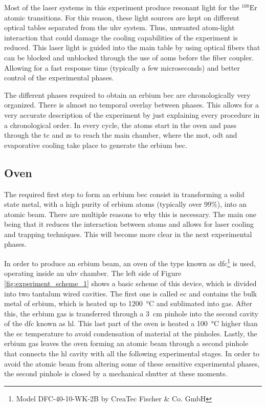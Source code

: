 Most of the laser systems in this experiment produce resonant light for the $^{\text{168}}\text{Er}$ atomic transitions. For this reason, these light sources are kept on different optical tables separated from the \ac{uhv} system. Thus, unwanted atom-light interaction that could damage the cooling capabilities of the experiment is reduced. This laser light is guided into the main table by using optical fibers that can be blocked and unblocked through the use of \acp{aom} before the fiber coupler. Allowing for a fast response time (typically a few microseconds) and better control of the experimental phases.

The different phases required to obtain an erbium \ac{bec} are chronologically very organized. There is almost no temporal overlay between phases. This allows for a very accurate description of the experiment by just explaining every procedure in a chronological order. In every cycle, the atoms start in the oven and pass through the \ac{tc} and \acf{zs} to reach the main chamber, where the \ac{mot}, \ac{odt} and evaporative cooling take place to generate the erbium \acl*{bec}.

\subsection{Oven}

The required first step to form an erbium \ac{bec} consist in transforming a solid state metal, with a high purity of erbium atoms (typically over 99\%), into an atomic beam. There are multiple reasons to why this is necessary. The main one being that it reduces the interaction between atoms and allows for laser cooling and trapping techniques. This will become more clear in the next experimental phases.

In order to produce an erbium beam, an oven of the type known as \Acf{dfc}\footnote{Model DFC-40-10-WK-2B by CreaTec Fischer \& Co. GmbH} is used, operating inside an \ac{uhv} chamber. The left side of Figure \ref{fig:experiment_scheme_1} shows a basic scheme of this device, which is divided into two tantalum wired cavities. The first one is called \Acf{ec} and contains the bulk metal of erbium, which is heated up to \SI{1200}{\degreeCelsius} and sublimated into gas. After this, the erbium gas is transferred through a \SI{3}{\centi\meter} pinhole into the second cavity of the \ac{dfc} known as \Acf{hl}. This last part of the oven is heated a \SI{100}{\degreeCelsius} higher than the \ac{ec} temperature to avoid condensation of material at the pinholes. Lastly, the erbium gas leaves the oven forming an atomic beam through a second pinhole that connects the \ac{hl} cavity with all the following experimental stages. In order to avoid the atomic beam from altering some of these sensitive experimental phases, the second pinhole is closed by a mechanical shutter at these moments. 

